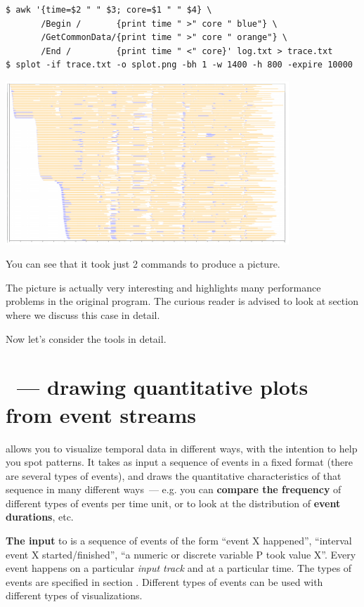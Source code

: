 \documentclass{article}
\begin{document}
\begin{verbatim}
$ awk '{time=$2 " " $3; core=$1 " " $4} \
       /Begin /       {print time " >" core " blue"} \
       /GetCommonData/{print time " >" core " orange"} \
       /End /         {print time " <" core}' log.txt > trace.txt
$ splot -if trace.txt -o splot.png -bh 1 -w 1400 -h 800 -expire 10000
\end{verbatim}

\centerline{\includegraphics[width=0.8\textwidth]{pics/splot/splot-main-example.png}}

You can see that it took just 2 commands to produce a picture.

The picture is actually very interesting and highlights many performance problems in the original program. The curious reader is advised to look at section  where we discuss this case in detail.

Now let's consider the tools in detail.

\pagebreak
\section{\timeplot{}~--- drawing quantitative plots from event streams}
\label{sec:tplot-intro}

\timeplot{} allows you to visualize temporal data in different ways, with the intention to help you spot patterns. It takes as input a sequence of events in a fixed format (there are several types of events), and draws the quantitative characteristics of that sequence in many different ways~--- e.g. you can \textbf{compare the frequency} of different types of events per time unit, or to look at the distribution of \textbf{event durations}, etc.

\textbf{The input} to \timeplot{} is a sequence of events of the form ``event X happened'', ``interval event X started/finished'', ``a numeric or discrete variable P took value X''. Every event happens on a particular \emph{input track} and at a particular time. The types of events are specified in section . Different types of events can be used with different types of visualizations.
\end{document}

